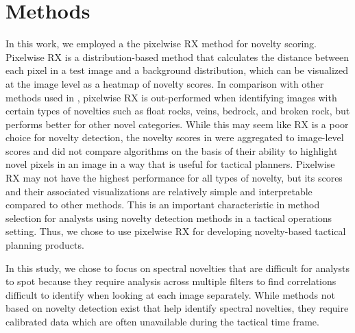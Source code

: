 \section{Methods}
In this work, we employed a the pixelwise RX method for novelty scoring.
Pixelwise RX is a distribution-based method that calculates the distance between each pixel in a test image and a background distribution, which can be visualized at the image level as a heatmap of novelty scores. 
In comparison with other methods used in \cite{kerner2020comparison}, pixelwise RX is out-performed when identifying images with certain types of novelties such as float rocks, veins, bedrock, and broken rock, but performs better for other novel categories. 
While this may seem like RX is a poor choice for novelty detection, the novelty scores in \cite{kerner2020comparison} were aggregated to image-level scores and did not compare algorithms on the basis of their ability to highlight novel pixels in an image in a way that is useful for tactical planners. 
Pixelwise RX may not have the highest performance for all types of novelty, but its scores and their associated visualizations are relatively simple and interpretable compared to other methods. 
This is an important characteristic in method selection for analysts using novelty detection methods in a tactical operations setting. Thus, we chose to use pixelwise RX for developing novelty-based tactical planning products. 

In this study, we chose to focus on spectral novelties that are difficult for analysts to spot because they require analysis across multiple filters to find correlations difficult to identify when looking at each image separately. 
While methods not based on novelty detection exist that help identify spectral novelties, they require calibrated data which are often unavailable during the tactical time frame. 

